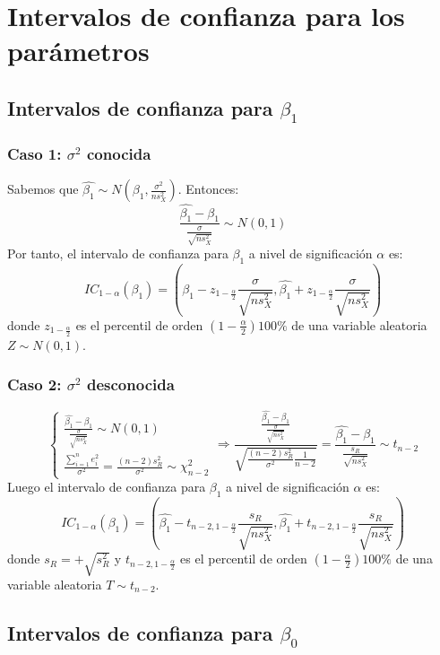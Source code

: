 \section{Intervalos de confianza para los parámetros}
\subsection*{Intervalos de confianza para $\beta_1$}
\subsubsection*{Caso 1: $\sigma^2$ conocida}
Sabemos que $\hat{\beta_1} \sim N(\beta_1, \frac{\sigma^2}{ns_X^2})$. Entonces:
$$\frac{\hat{\beta_1} - \beta_1}{\frac{\sigma}{\sqrt{ns_X^2}}} \sim N(0, 1)$$
Por tanto, el intervalo de confianza para $\beta_1$ a nivel de significación $\alpha$ es:
$$IC_{1-\alpha}(\beta_1) = \left( \hat{\beta_1} - z_{1-\frac{\alpha}{2}} \frac{\sigma}{\sqrt{ns_X^2}}, \hat{\beta_1} + z_{1-\frac{\alpha}{2}} \frac{\sigma}{\sqrt{ns_X^2}} \right)$$
donde $z_{1-\frac{\alpha}{2}}$ es el percentil de orden $(1 - \frac{\alpha}{2}) 100\%$ de una variable aleatoria $Z \sim N(0, 1)$.

\subsubsection*{Caso 2: $\sigma^2$ desconocida}
$$\begin{cases}
        \frac{\hat{\beta_1} - \beta_1}{\frac{\sigma}{\sqrt{ns_X^2}}} \sim N(0, 1) \\
        \frac{\sum_{i=1}^n e_i^2}{\sigma^2} = \frac{(n-2)s_R^2}{\sigma^2} \sim \chi^2_{n-2}
    \end{cases} \Rightarrow
    \frac{\frac{\hat{\beta_1} - \beta_1}{\frac{\sigma}{\sqrt{ns_X^2}}}}{\sqrt{\frac{(n-2)s_R^2}{\sigma^2} \frac{1}{n-2}}} = \frac{\hat{\beta_1} - \beta_1}{\frac{s_R}{\sqrt{ns_X^2}}} \sim t_{n-2}$$
Luego el intervalo de confianza para $\beta_1$ a nivel de significación $\alpha$ es:
$$IC_{1-\alpha}(\beta_1) = \left( \hat{\beta_1} - t_{n-2, 1-\frac{\alpha}{2}} \frac{s_R}{\sqrt{ns_X^2}}, \hat{\beta_1} + t_{n-2, 1-\frac{\alpha}{2}} \frac{s_R}{\sqrt{ns_X^2}} \right)$$
donde $s_R = +\sqrt{s_R^2}$ y $t_{n-2, 1-\frac{\alpha}{2}}$ es el percentil de orden $(1 - \frac{\alpha}{2}) 100\%$ de una variable aleatoria $T \sim t_{n-2}$.

\subsection*{Intervalos de confianza para $\beta_0$}
